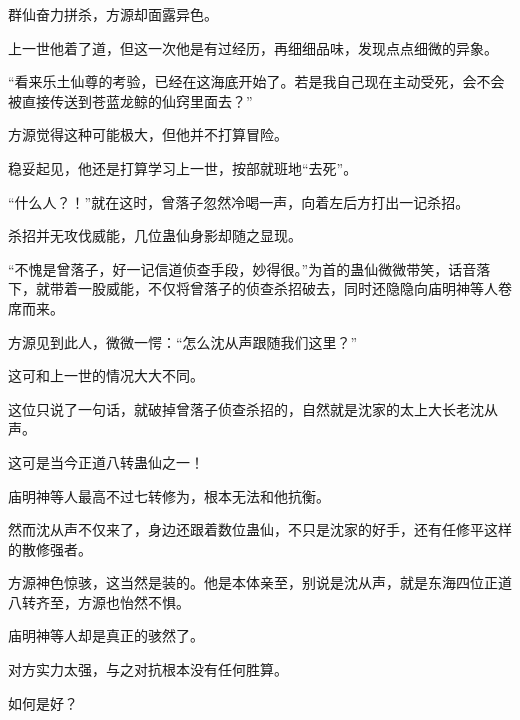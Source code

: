 \begin{this_body}
群仙奋力拼杀，方源却面露异色。

上一世他着了道，但这一次他是有过经历，再细细品味，发现点点细微的异象。

“看来乐土仙尊的考验，已经在这海底开始了。若是我自己现在主动受死，会不会被直接传送到苍蓝龙鲸的仙窍里面去？”

方源觉得这种可能极大，但他并不打算冒险。

稳妥起见，他还是打算学习上一世，按部就班地“去死”。

“什么人？！”就在这时，曾落子忽然冷喝一声，向着左后方打出一记杀招。

杀招并无攻伐威能，几位蛊仙身影却随之显现。

“不愧是曾落子，好一记信道侦查手段，妙得很。”为首的蛊仙微微带笑，话音落下，就带着一股威能，不仅将曾落子的侦查杀招破去，同时还隐隐向庙明神等人卷席而来。

方源见到此人，微微一愕：“怎么沈从声跟随我们这里？”

这可和上一世的情况大大不同。

这位只说了一句话，就破掉曾落子侦查杀招的，自然就是沈家的太上大长老沈从声。

这可是当今正道八转蛊仙之一！

庙明神等人最高不过七转修为，根本无法和他抗衡。

然而沈从声不仅来了，身边还跟着数位蛊仙，不只是沈家的好手，还有任修平这样的散修强者。

方源神色惊骇，这当然是装的。他是本体亲至，别说是沈从声，就是东海四位正道八转齐至，方源也怡然不惧。

庙明神等人却是真正的骇然了。

对方实力太强，与之对抗根本没有任何胜算。

如何是好？

\end{this_body}

